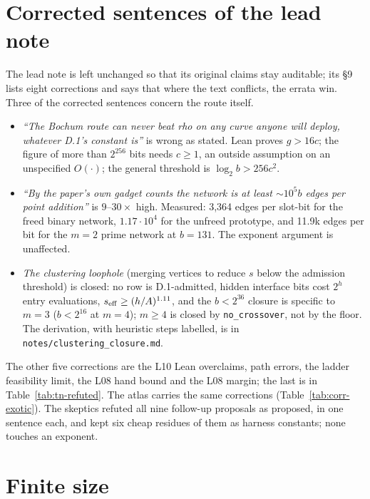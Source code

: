 \section{Corrected sentences of the lead note}\label{sec:tn-corrections}

The lead note is left unchanged so that its original claims stay auditable;
its \S9 lists eight corrections and says that where the text conflicts,
the errata win. Three of the corrected sentences concern the route itself.
\begin{itemize}
\item \emph{``The Bochum route can never beat rho on any curve anyone will
  deploy, whatever D.1's constant is''} is wrong as stated. Lean proves
  $g>16c$; the figure of more than $2^{256}$ bits needs $c\ge1$, an outside
  assumption on an unspecified $O(\cdot)$; the general threshold is
  $\log_2b>256c^2$.
\item \emph{``By the paper's own gadget counts the network is at least
  $\sim10^5b$ edges per point addition''} is $9$--$30\times$ high. Measured:
  3{,}364 edges per slot-bit for the freed binary network, $1.17\cdot10^4$ for
  the unfreed prototype, and 11.9k edges per bit for the $m=2$ prime network
  at $b=131$. The exponent argument is unaffected.
\item \emph{The clustering loophole} (merging vertices to reduce $s$ below
  the admission threshold) is closed: no row is D.1-admitted, hidden
  interface bits cost $2^h$ entry evaluations, $s_{\rm eff}\ge(h/A)^{1.11}$,
  and the $b<2^{36}$ closure is specific to $m=3$ ($b<2^{16}$ at $m=4$); $m\ge4$
  is closed by \texttt{no\_crossover}, not by the floor. The derivation, with
  heuristic steps labelled, is in \texttt{notes/clustering\_closure.md}.
\end{itemize}
The other five corrections are the L10 Lean overclaims, path errors, the
ladder feasibility limit, the L08 hand bound and the L08 margin; the last is
in Table~\ref{tab:tn-refuted}. The atlas carries the same corrections
(Table~\ref{tab:corr-exotic}). The skeptics refuted all nine follow-up proposals as proposed, in
one sentence each, and kept six cheap residues of them as harness constants;
none touches an exponent.

\section{Finite size}\label{sec:tn-finite}


